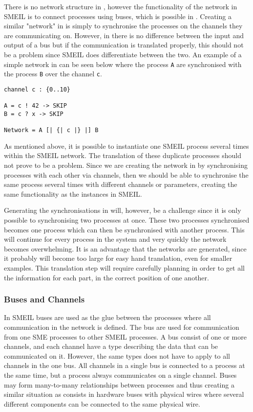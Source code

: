 There is no network structure in \cspm{}, however the functionality of the network in SMEIL is to connect processes using buses, which is possible in \cspm{}. Creating a similar "network" in \cspm{} is simply to synchronise the processes on the channels they are communicating on. However, in \cspm{} there is no difference between the input and output of a bus but if the communication is translated properly, this should not be a problem since SMEIL does differentiate between the two.
An example of a simple network in \cspm{} can be seen below where the process \texttt{A} are synchronised with the process \texttt{B} over the channel \texttt{c}.
\begin{verbatim}
channel c : {0..10}

A = c ! 42 -> SKIP
B = c ? x -> SKIP

Network = A [| {| c |} |] B
\end{verbatim}

As mentioned above, it is possible to instantiate one SMEIL process several times within the SMEIL network. The translation of these duplicate processes should not prove to be a problem. Since we are creating the network in \cspm{} by synchronising processes with each other via channels, then we should be able to synchronise the same process several times with different channels or parameters, creating the same functionality as the instances in SMEIL.

Generating the synchronisations in \cspm{} will, however, be a challenge since it is only possible to synchronising two processes at once. These two processes synchronised becomes one process which can then be synchronised with another process. This will continue for every process in the system and very quickly the network becomes overwhelming. It is an advantage that the \cspm{} networks are generated, since it probably will become too large for easy hand translation, even for smaller examples.
This translation step will require carefully planning in order to get all the information for each part, in the correct position of one another.

\subsubsection{Buses and Channels}
In SMEIL buses are used as the glue between the processes where all communication in the network is defined. The bus are used for communication from one SME processes to other SMEIL processes. A bus consist of one or more channels, and each channel have a type describing the data that can be communicated on it. However, the same types does not have to apply to all channels in the one bus. All channels in a single bus is connected to a process at the same time, but a process always communicates on a single channel.
Buses may form many-to-many relationships between processes and thus creating a similar situation as consists in hardware buses with physical wires where several different components can be connected to the same physical wire.

